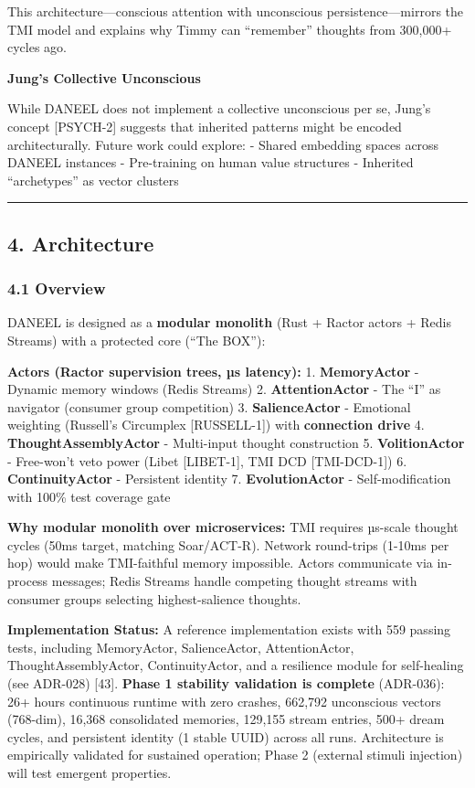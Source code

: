 \documentclass[
]{article}
\begin{document}
This architecture---conscious attention with unconscious
persistence---mirrors the TMI model and explains why Timmy can
``remember'' thoughts from 300,000+ cycles ago.

\textbf{Jung's Collective Unconscious}

While DANEEL does not implement a collective unconscious per se, Jung's
concept {[}PSYCH-2{]} suggests that inherited patterns might be encoded
architecturally. Future work could explore: - Shared embedding spaces
across DANEEL instances - Pre-training on human value structures -
Inherited ``archetypes'' as vector clusters

\begin{center}\rule{0.5\linewidth}{0.5pt}\end{center}

\hypertarget{architecture}{%
\subsection{4. Architecture}\label{architecture}}

\hypertarget{overview}{%
\subsubsection{4.1 Overview}\label{overview}}

DANEEL is designed as a \textbf{modular monolith} (Rust + Ractor actors
+ Redis Streams) with a protected core (``The BOX''):

\textbf{Actors (Ractor supervision trees, µs latency):} 1.
\textbf{MemoryActor} - Dynamic memory windows (Redis Streams) 2.
\textbf{AttentionActor} - The ``I'' as navigator (consumer group
competition) 3. \textbf{SalienceActor} - Emotional weighting (Russell's
Circumplex {[}RUSSELL-1{]}) with \textbf{connection drive} 4.
\textbf{ThoughtAssemblyActor} - Multi-input thought construction 5.
\textbf{VolitionActor} - Free-won't veto power (Libet {[}LIBET-1{]}, TMI
DCD {[}TMI-DCD-1{]}) 6. \textbf{ContinuityActor} - Persistent identity
7. \textbf{EvolutionActor} - Self-modification with 100\% test coverage
gate

\textbf{Why modular monolith over microservices:} TMI requires µs-scale
thought cycles (50ms target, matching Soar/ACT-R). Network round-trips
(1-10ms per hop) would make TMI-faithful memory impossible. Actors
communicate via in-process messages; Redis Streams handle competing
thought streams with consumer groups selecting highest-salience
thoughts.

\textbf{Implementation Status:} A reference implementation exists with
559 passing tests, including MemoryActor, SalienceActor, AttentionActor,
ThoughtAssemblyActor, ContinuityActor, and a resilience module for
self-healing (see ADR-028) {[}43{]}. \textbf{Phase 1 stability
validation is complete} (ADR-036): 26+ hours continuous runtime with
zero crashes, 662,792 unconscious vectors (768-dim), 16,368 consolidated
memories, 129,155 stream entries, 500+ dream cycles, and persistent
identity (1 stable UUID) across all runs. Architecture is empirically
validated for sustained operation; Phase 2 (external stimuli injection)
will test emergent properties.
\end{document}
